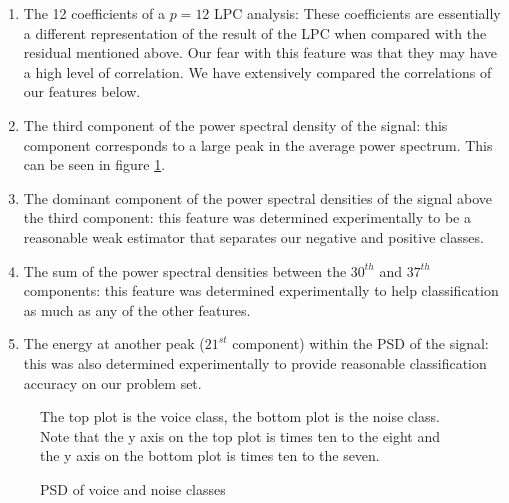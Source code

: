 \documentclass[ %
                    author={Sam Phippen},
                supervisor={Dr. Rafal Bogacz},
                     title={Real time voice activity detectors in noisy personal computing environments},
                  subtitle={},
                    degree={MEng},
                      year={2012} ]{thesis}
\begin{document}
\begin{enumerate}
    \item The 12 coefficients of a $p=12$ LPC analysis: These coefficients
        are essentially a different representation of the result of the LPC
        when compared with the residual mentioned above. Our fear with this
        feature was that they may have a high level of correlation. We have
        extensively compared the correlations of our features below.

    \item The third component of the power spectral density of the signal: this
        component corresponds to a large peak in the average power spectrum.
        This can be seen in figure \ref{fig:psd}.

    \item The dominant component of the power spectral densities of the signal
        above the third component: this feature was determined experimentally
        to be a reasonable weak estimator that separates our negative and
        positive classes.

    \item The sum of the power spectral densities between the $30^{th}$ and $37^{th}$
        components: this feature was determined experimentally to help
        classification as much as any of the other features.

    \item The energy at another peak ($21^{st}$ component) within the PSD of the
        signal: this was also determined experimentally to provide reasonable
        classification accuracy on our problem set.

\end{enumerate}

\begin{figure}

    \caption{PSD of voice and noise classes}

    The top plot is the voice class, the bottom plot is the noise class. Note
    that the y axis on the top plot is times ten to the eight and the y axis on
    the bottom plot is times ten to the seven.


    \label{fig:psd}

\end{figure}
\end{document}
